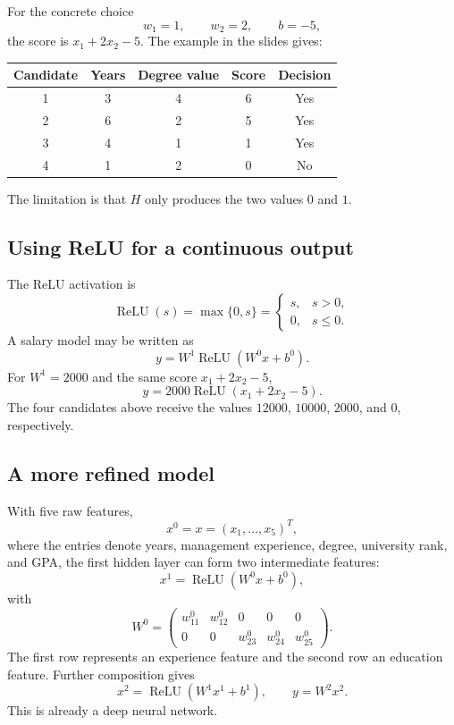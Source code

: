 \documentclass[11pt,a4paper]{article}
\newcommand{\ReLU}{\operatorname{ReLU}}
\theoremstyle{definition}
\theoremstyle{plain}
\theoremstyle{remark}
\begin{document}
For the concrete choice
\[
  w_1=1,\qquad w_2=2,\qquad b=-5,
\]
the score is $x_1+2x_2-5$. The example in the slides gives:
\begin{center}
\begin{tabular}{ccccc}
\toprule
Candidate & Years & Degree value & Score & Decision\\
\midrule
1 & 3 & 4 & 6 & Yes\\
2 & 6 & 2 & 5 & Yes\\
3 & 4 & 1 & 1 & Yes\\
4 & 1 & 2 & 0 & No\\
\bottomrule
\end{tabular}
\end{center}
The limitation is that $H$ only produces the two values $0$ and $1$.

\subsection{Using ReLU for a continuous output}
The ReLU activation is
\[
  \ReLU(s)=\max\{0,s\}=
  \begin{cases}
    s,&s>0,\\
    0,&s\le 0.
  \end{cases}
\]
A salary model may be written as
\[
  y=W^1\ReLU(W^0x+b^0).
\]
For $W^1=2000$ and the same score $x_1+2x_2-5$,
\[
  y=2000\ReLU(x_1+2x_2-5).
\]
The four candidates above receive the values $12000$, $10000$, $2000$, and $0$, respectively.

\begin{center}
\end{center}

\subsection{A more refined model}
With five raw features,
\[
  x^0=x=(x_1,\ldots,x_5)^T,
\]
where the entries denote years, management experience, degree, university rank, and GPA, the first hidden layer can form two intermediate features:
\[
  x^1=\ReLU(W^0x+b^0),
\]
with
\[
  W^0=
  \begin{pmatrix}
    w_{11}^0&w_{12}^0&0&0&0\\
    0&0&w_{23}^0&w_{24}^0&w_{25}^0
  \end{pmatrix}.
\]
The first row represents an experience feature and the second row an education feature. Further composition gives
\[
  x^2=\ReLU(W^1x^1+b^1),\qquad y=W^2x^2.
\]
This is already a deep neural network.
\end{document}
